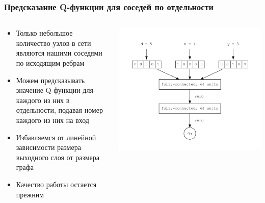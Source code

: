 \documentclass{beamer}
\begin{document}
\begin{frame}
  \frametitle{Предсказание Q-функции для соседей по отдельности}
  \begin{columns}
    \begin{column}{0.6\textwidth}
      \begin{itemize}
      \item Только небольшое количество узлов в сети являются нашими соседями по
        исходящим ребрам
      \item Можем предсказывать значение Q-функции для каждого из них в
        отдельности, подавая номер каждого из них на вход
      \item Избавляемся от линейной зависимости размера выходного слоя от
        размера графа
      \item Качество работы остается прежним
      \end{itemize}
    \end{column}
    \begin{column}{0.4\textwidth}
      \begin{center}
        \includegraphics[width=\textwidth]{nn-1-one-out}
      \end{center}
    \end{column}
  \end{columns}
\end{frame}
\end{document}

